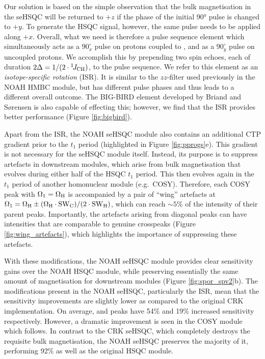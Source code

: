 \documentclass[11pt]{article}
\newcommand*{\carbon}{\ce{^{13}C}}
\newcommand*{\proton}{\ce{^{1}H}}
\newcommand*{\onejch}{{}^{1}\!J_{\ce{CH}}}
\newcommand*{\figref}[1]{Figure \ref{fig:#1}}
\begin{document}
Our solution is based on the simple observation that the bulk magnetisation in the seHSQC will be returned to $+z$ if the phase of the initial \proton{} \ang{90} pulse is changed to $+y$.
To generate the HSQC signal, however, the same pulse needs to be applied along $+x$.
Overall, what we need is therefore a pulse sequence element which simultaneously acts as a $90^\circ_x$ pulse on protons coupled to \carbon{}, and as a $90^\circ_y$ pulse on uncoupled protons.
We accomplish this by prepending two spin echoes, each of duration $2\Delta = 1/(2 \cdot \onejch)$, to the pulse sequence.
We refer to this element as an \textit{isotope-specific rotation} (ISR).
It is similar to the $zz$-filter used previously in the NOAH HMBC module,\autocite{Kupce2018CC, Kupce2019JMR} but has different pulse phases and thus leads to a different overall outcome.
The BIG-BIRD element developed by Briand and S{\o}rensen is also capable of effecting this;\autocite{Briand1997JMR} however, we find that the ISR provides better performance (\figref{bigbird}).

Apart from the ISR, the NOAH seHSQC module also contains an additional CTP gradient prior to the $t_1$ period (highlighted in \figref{pprogs}e).
This gradient is not necessary for the seHSQC module itself.
Instead, its purpose is to suppress artefacts in downstream modules, which arise from bulk magnetisation that evolves during either half of the HSQC $t_1$ period.
This then evolves again in the $t_1$ period of another homonuclear module (e.g.\ COSY).
Therefore, each COSY peak with $\Omega_1 = \Omega_{\ce{H}}$ is accompanied by a pair of ``wing'' artefacts at $\Omega_1 = \Omega_{\ce{H}} \pm (\Omega_{\ce{H}}\cdot\mathrm{SW}_{\ce{C}})/(2\cdot \mathrm{SW}_{\ce{H}})$, which can reach $\sim 5\%$ of the intensity of their parent peaks.
Importantly, the artefacts arising from diagonal peaks can have intensities that are comparable to genuine crosspeaks (\figref{wing_artefacts}), which highlights the importance of suppressing these artefacts.

With these modifications, the NOAH seHSQC module provides clear sensitivity gains over the NOAH HSQC module, while preserving essentially the same amount of magnetisation for downstream modules (\figref{spor_spv2}b).
The modifications present in the NOAH seHSQC, particularly the ISR, mean that the sensitivity improvements are slightly lower as compared to the original CRK implementation.
On average,  and  peaks have 54\% and 19\% increased sensitivity respectively.
However, a dramatic improvement is seen in the COSY module which follows.
In contrast to the CRK seHSQC, which completely destroys the requisite bulk magnetisation, the NOAH seHSQC preserves the majority of it, performing 92\% as well as the original HSQC module.
\end{document}

